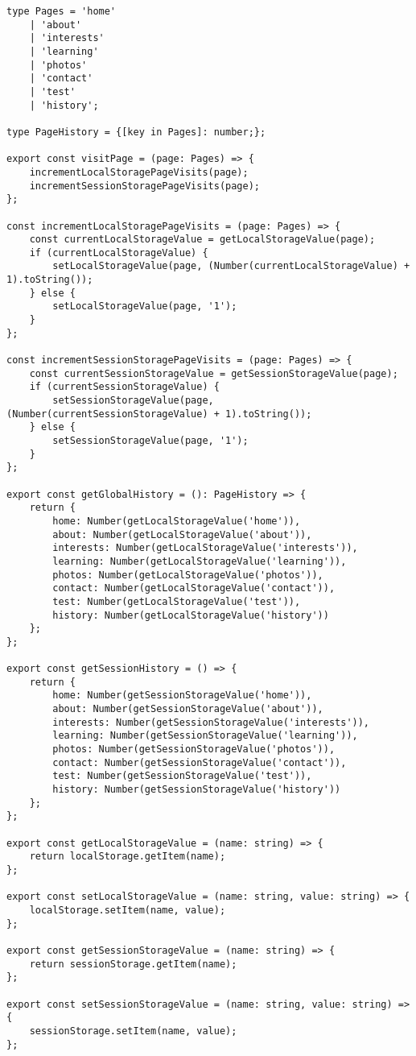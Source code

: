 \documentclass[a4paper,14pt]{extarticle}
\begin{document}
\begin{lstlisting}
type Pages = 'home'
    | 'about'
    | 'interests'
    | 'learning'
    | 'photos'
    | 'contact'
    | 'test'
    | 'history';

type PageHistory = {[key in Pages]: number;};

export const visitPage = (page: Pages) => {
    incrementLocalStoragePageVisits(page);
    incrementSessionStoragePageVisits(page);
};

const incrementLocalStoragePageVisits = (page: Pages) => {
    const currentLocalStorageValue = getLocalStorageValue(page);
    if (currentLocalStorageValue) {
        setLocalStorageValue(page, (Number(currentLocalStorageValue) + 1).toString());
    } else {
        setLocalStorageValue(page, '1');
    }
};

const incrementSessionStoragePageVisits = (page: Pages) => {
    const currentSessionStorageValue = getSessionStorageValue(page);
    if (currentSessionStorageValue) {
        setSessionStorageValue(page, (Number(currentSessionStorageValue) + 1).toString());
    } else {
        setSessionStorageValue(page, '1');
    }
};

export const getGlobalHistory = (): PageHistory => {
    return {
        home: Number(getLocalStorageValue('home')),
        about: Number(getLocalStorageValue('about')),
        interests: Number(getLocalStorageValue('interests')),
        learning: Number(getLocalStorageValue('learning')),
        photos: Number(getLocalStorageValue('photos')),
        contact: Number(getLocalStorageValue('contact')),
        test: Number(getLocalStorageValue('test')),
        history: Number(getLocalStorageValue('history'))
    };
};

export const getSessionHistory = () => {
    return {
        home: Number(getSessionStorageValue('home')),
        about: Number(getSessionStorageValue('about')),
        interests: Number(getSessionStorageValue('interests')),
        learning: Number(getSessionStorageValue('learning')),
        photos: Number(getSessionStorageValue('photos')),
        contact: Number(getSessionStorageValue('contact')),
        test: Number(getSessionStorageValue('test')),
        history: Number(getSessionStorageValue('history'))
    };
};

export const getLocalStorageValue = (name: string) => {
    return localStorage.getItem(name);
};

export const setLocalStorageValue = (name: string, value: string) => {
    localStorage.setItem(name, value);
};

export const getSessionStorageValue = (name: string) => {
    return sessionStorage.getItem(name);
};

export const setSessionStorageValue = (name: string, value: string) => {
    sessionStorage.setItem(name, value);
};
\end{lstlisting}
\end{document}
